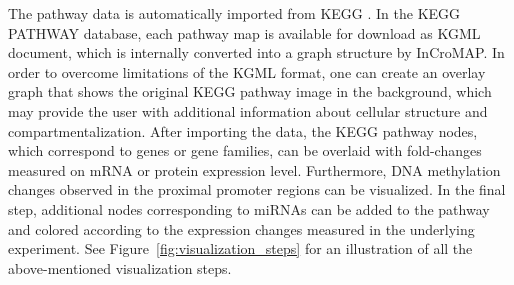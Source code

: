 \documentclass{bioinfo}
\begin{document}

The pathway data is automatically imported from KEGG \citep{KEGG}. In the KEGG PATHWAY database, each pathway map
is available for download as KGML document, which is internally converted into a graph structure
by InCroMAP. In order to overcome limitations of the KGML format, one can create an overlay
graph that shows the original KEGG pathway image in the background, which may provide the user with
additional information about cellular structure and compartmentalization.
%
After importing the data, the KEGG pathway nodes, which correspond to genes or gene families, can be
overlaid with fold-changes measured on mRNA or protein expression level. Furthermore, DNA
methylation changes observed in the proximal promoter regions can be visualized. In the final step,
additional nodes corresponding to miRNAs can be added to the pathway and colored according to the
expression changes measured in the underlying experiment. See Figure~\ref{fig:visualization_steps}
for an illustration of all the above-mentioned visualization steps.
\end{document}
